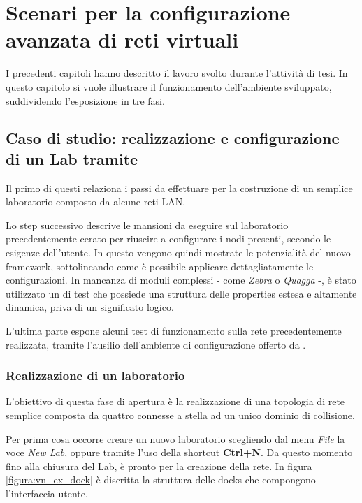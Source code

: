 \chapter{Scenari per la configurazione avanzata di reti virtuali}\label{capitolo:esempi}

I precedenti capitoli hanno descritto il lavoro svolto durante l'attività di tesi. In questo capitolo si vuole illustrare il funzionamento dell'ambiente sviluppato, suddividendo l'esposizione in tre fasi.


\section{Caso di studio: realizzazione e configurazione di un Lab tramite \visualnetkit{}}
Il primo di questi relaziona i passi da effettuare per la costruzione di un semplice laboratorio composto da alcune reti LAN.

Lo step successivo descrive le mansioni da eseguire sul laboratorio precedentemente cerato per riuscire a configurare i nodi presenti, secondo le esigenze dell'utente. In questo vengono quindi mostrate le potenzialità del nuovo \plugin{} framework, sottolineando come è possibile applicare dettagliatamente le configurazioni. In mancanza di moduli complessi - come \emph{Zebra} o \emph{Quagga} -, è stato utilizzato un \plugin{} di test che possiede una struttura delle properties estesa e altamente dinamica, priva di un significato logico.

L'ultima parte espone alcuni test di funzionamento sulla rete precedentemente realizzata, tramite l'ausilio dell'ambiente di configurazione offerto da \netkit{}.

\subsection{Realizzazione di un laboratorio}
L'obiettivo di questa fase di apertura è la realizzazione di una topologia di rete semplice composta da quattro \virtualmachine{} connesse a stella ad un unico dominio di collisione.

Per prima cosa occorre creare un nuovo laboratorio scegliendo dal menu \emph{File} la voce \emph{New Lab}, oppure tramite l'uso della shortcut \textbf{Ctrl+N}. Da questo momento fino alla chiusura del Lab, \visualnetkit{} è pronto per la creazione della rete. In figura \ref{figura:vn_ex_dock} è discritta la struttura delle docks che compongono l'interfaccia utente.

